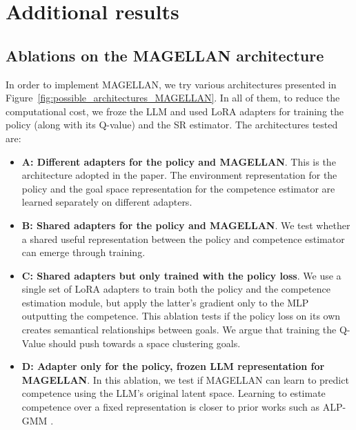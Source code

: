 \newpage
\section{Additional results} \label{app:additional_results}

\subsection{Ablations on the MAGELLAN architecture} \label{app:additional_results_magellan_architecture}

In order to implement MAGELLAN, we try various architectures presented in Figure~\ref{fig:possible_architectures_MAGELLAN}. In all of them, to reduce the computational cost, we froze the LLM and used LoRA adapters \cite{Hu2021LoRALA} for training the policy (along with its Q-value) and the SR estimator. The architectures tested are:
\begin{itemize}
    \item \textbf{A: Different adapters for the policy and MAGELLAN}. This is the architecture adopted in the paper. The environment representation for the policy and the goal space representation for the competence estimator are learned separately on different adapters.
    \item \textbf{B: Shared adapters for the policy and MAGELLAN}. We test whether a shared useful representation between the policy and competence estimator can emerge through training.
    \item \textbf{C: Shared adapters but only trained with the policy loss}. We use a single set of LoRA adapters to train both the policy and the competence estimation module, but apply the latter's gradient only to the MLP outputting the competence. This ablation tests if the policy loss on its own creates semantical relationships between goals. We argue that training the Q-Value should push towards a space clustering goals.
    \item \textbf{D: Adapter only for the policy, frozen LLM representation for MAGELLAN}. In this ablation, we test if MAGELLAN can learn to predict competence using the LLM's original latent space. Learning to estimate competence over a fixed representation is closer to prior works such as ALP-GMM \cite{portelas_teacher_2019}.   
     
\end{itemize}

